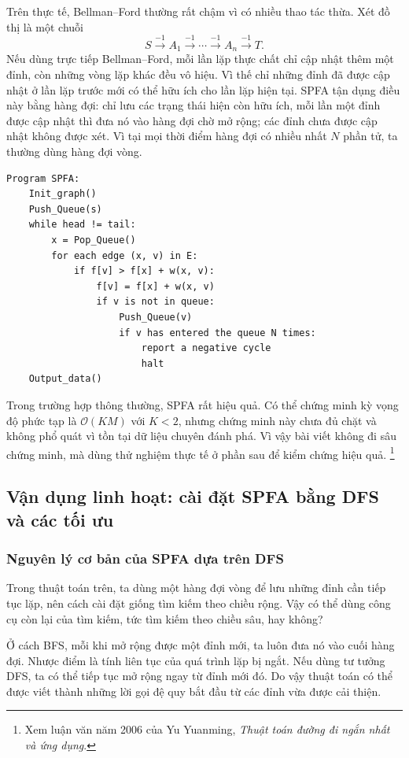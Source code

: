 \documentclass[11pt]{article}
\newcommand{\Oh}{\mathcal{O}}
\begin{document}
Trên thực tế, Bellman--Ford thường rất chậm vì có nhiều thao tác thừa. Xét đồ
thị là một chuỗi
\[
  S \xrightarrow{-1} A_1 \xrightarrow{-1} \cdots
  \xrightarrow{-1} A_n \xrightarrow{-1} T.
\]
Nếu dùng trực tiếp Bellman--Ford, mỗi lần lặp thực chất chỉ cập nhật thêm một
đỉnh, còn những vòng lặp khác đều vô hiệu. Vì thế chỉ những đỉnh đã được cập
nhật ở lần lặp trước mới có thể hữu ích cho lần lặp hiện tại. SPFA tận dụng
điều này bằng hàng đợi: chỉ lưu các trạng thái hiện còn hữu ích, mỗi lần một
đỉnh được cập nhật thì đưa nó vào hàng đợi chờ mở rộng; các đỉnh chưa được
cập nhật không được xét. Vì tại mọi thời điểm hàng đợi có nhiều nhất \(N\)
phần tử, ta thường dùng hàng đợi vòng.

\begin{verbatim}
Program SPFA:
    Init_graph()
    Push_Queue(s)
    while head != tail:
        x = Pop_Queue()
        for each edge (x, v) in E:
            if f[v] > f[x] + w(x, v):
                f[v] = f[x] + w(x, v)
                if v is not in queue:
                    Push_Queue(v)
                    if v has entered the queue N times:
                        report a negative cycle
                        halt
    Output_data()
\end{verbatim}

Trong trường hợp thông thường, SPFA rất hiệu quả. Có thể chứng minh kỳ vọng
độ phức tạp là \(\Oh(KM)\) với \(K<2\), nhưng chứng minh này chưa đủ chặt và
không phổ quát vì tồn tại dữ liệu chuyên đánh phá. Vì vậy bài viết không đi
sâu chứng minh, mà dùng thử nghiệm thực tế ở phần sau để kiểm chứng hiệu quả.
\footnote{Xem luận văn năm 2006 của Yu Yuanming, \textit{Thuật toán đường đi
ngắn nhất và ứng dụng}.}

\subsection{Vận dụng linh hoạt: cài đặt SPFA bằng DFS và các tối ưu}

\subsubsection{Nguyên lý cơ bản của SPFA dựa trên DFS}

Trong thuật toán trên, ta dùng một hàng đợi vòng để lưu những đỉnh cần tiếp
tục lặp, nên cách cài đặt giống tìm kiếm theo chiều rộng. Vậy có thể dùng
công cụ còn lại của tìm kiếm, tức tìm kiếm theo chiều sâu, hay không?

Ở cách BFS, mỗi khi mở rộng được một đỉnh mới, ta luôn đưa nó vào cuối hàng
đợi. Nhược điểm là tính liên tục của quá trình lặp bị ngắt. Nếu dùng tư tưởng
DFS, ta có thể tiếp tục mở rộng ngay từ đỉnh mới đó. Do vậy thuật toán có thể
được viết thành những lời gọi đệ quy bắt đầu từ các đỉnh vừa được cải thiện.
\end{document}
